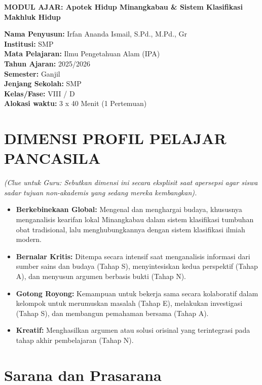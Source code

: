\documentclass[a4paper,12pt]{article}
\begin{document}
\begin{center}
{\Large\textbf{MODUL AJAR: Apotek Hidup Minangkabau \& Sistem Klasifikasi Makhluk Hidup}}
\end{center}

\vspace{0.5cm}

\begin{tcolorbox}[mainbox]
\textbf{Nama Penyusun:} Irfan Ananda Ismail, S.Pd., M.Pd., Gr \\
\textbf{Institusi:} SMP \\
\textbf{Mata Pelajaran:} Ilmu Pengetahuan Alam (IPA) \\
\textbf{Tahun Ajaran:} 2025/2026 \\
\textbf{Semester:} Ganjil \\
\textbf{Jenjang Sekolah:} SMP \\
\textbf{Kelas/Fase:} VIII / D \\
\textbf{Alokasi waktu:} 3 x 40 Menit (1 Pertemuan)
\end{tcolorbox}

\section{DIMENSI PROFIL PELAJAR PANCASILA}
\textit{(Clue untuk Guru: Sebutkan dimensi ini secara eksplisit saat apersepsi agar siswa sadar tujuan non-akademis yang sedang mereka kembangkan).}

\begin{itemize}
\item \textbf{Berkebinekaan Global:} Mengenal dan menghargai budaya, khususnya menganalisis kearifan lokal Minangkabau dalam sistem klasifikasi tumbuhan obat tradisional, lalu menghubungkannya dengan sistem klasifikasi ilmiah modern.
\item \textbf{Bernalar Kritis:} Ditempa secara intensif saat menganalisis informasi dari sumber sains dan budaya (Tahap S), menyintesiskan kedua perspektif (Tahap A), dan menyusun argumen berbasis bukti (Tahap N).
\item \textbf{Gotong Royong:} Kemampuan untuk bekerja sama secara kolaboratif dalam kelompok untuk merumuskan masalah (Tahap E), melakukan investigasi (Tahap S), dan membangun pemahaman bersama (Tahap A).
\item \textbf{Kreatif:} Menghasilkan argumen atau solusi orisinal yang terintegrasi pada tahap akhir pembelajaran (Tahap N).
\end{itemize}

\section{Sarana dan Prasarana}
\end{document}

